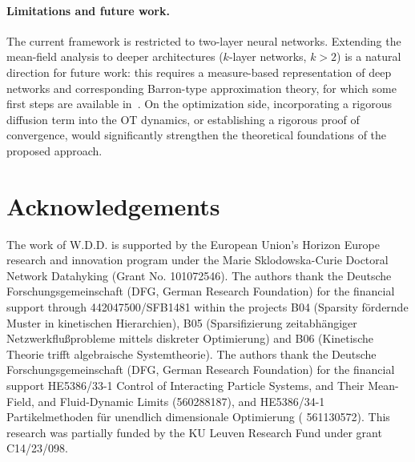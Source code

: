 \documentclass[a4paper, 11pt]{article}
\theoremstyle{plain} %
\begin{document}
	\paragraph{Limitations and future work.} The current framework is restricted to two-layer neural networks. Extending the mean-field analysis to deeper architectures ($k$-layer networks, $k > 2$) is a natural direction for future work: this requires a measure-based representation of deep networks and corresponding Barron-type approximation theory, for which some first steps are available in~\cite{eBarronSpaceFlowInduced2022}. On the optimization side, incorporating a rigorous diffusion term into the OT dynamics, or establishing a rigorous proof of convergence, would significantly strengthen the theoretical foundations of the proposed approach.

	\section*{Acknowledgements}
	The work of W.D.D. is supported by the European Union’s Horizon Europe research and innovation program under the Marie Sklodowska-Curie Doctoral Network Datahyking (Grant No. 101072546). The authors thank the Deutsche Forschungsgemeinschaft (DFG, German Research Foundation) for the financial support through 442047500/SFB1481 within the projects B04 (Sparsity fördernde Muster in kinetischen Hierarchien), B05 (Sparsifizierung zeitabhängiger Netzwerkflußprobleme mittels diskreter Optimierung) and B06 (Kinetische Theorie trifft algebraische Systemtheorie). The authors thank the Deutsche Forschungsgemeinschaft (DFG, German Research Foundation) for the financial support HE5386/33-1 Control of Interacting Particle Systems, and Their Mean-Field, and Fluid-Dynamic Limits (560288187), and  HE5386/34-1 Partikelmethoden für unendlich dimensionale Optimierung ( 561130572). This research was partially funded by the KU Leuven Research Fund under grant C14/23/098.


	
	

	
\end{document}
